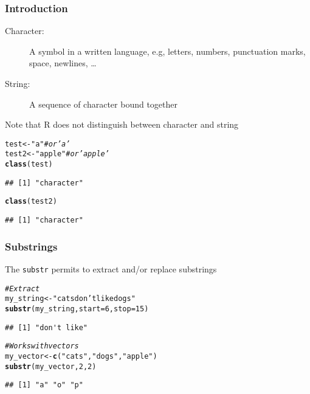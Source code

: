 \documentclass[paper=screen,mathserif]{beamer}\usepackage[]{graphicx}\usepackage[]{color}
\makeatletter
\newcommand{\hlnum}[1]{\textcolor[rgb]{0.686,0.059,0.569}{#1}}%
\newcommand{\hlstr}[1]{\textcolor[rgb]{0.192,0.494,0.8}{#1}}%
\newcommand{\hlcom}[1]{\textcolor[rgb]{0.678,0.584,0.686}{\textit{#1}}}%
\newcommand{\hlstd}[1]{\textcolor[rgb]{0.345,0.345,0.345}{#1}}%
\newcommand{\hlkwb}[1]{\textcolor[rgb]{0.69,0.353,0.396}{#1}}%
\newcommand{\hlkwc}[1]{\textcolor[rgb]{0.333,0.667,0.333}{#1}}%
\newcommand{\hlkwd}[1]{\textcolor[rgb]{0.737,0.353,0.396}{\textbf{#1}}}%
\newenvironment{kframe}{%
 \def\at@end@of@kframe{}%
 \ifinner\ifhmode%
  \def\at@end@of@kframe{\end{minipage}}%
  \begin{minipage}{\columnwidth}%
 \fi\fi%
 \def\FrameCommand##1{\hskip\@totalleftmargin \hskip-\fboxsep
 \colorbox{shadecolor}{##1}\hskip-\fboxsep
     \hskip-\linewidth \hskip-\@totalleftmargin \hskip\columnwidth}%
 \MakeFramed {\advance\hsize-\width
   \@totalleftmargin\z@ \linewidth\hsize
   \@setminipage}}%
 {\par\unskip\endMakeFramed%
 \at@end@of@kframe}
\newenvironment{knitrout}{}{} %
\newcommand{\ft}[1]{\frametitle{#1}}
\newenvironment{xframe}[1][]
{\begin{frame}[fragile,environment=xframe]
    \frametitle{#1}}
  {\end{frame}}
\makeatother
\begin{document}
\begin{xframe}
  \ft{Introduction}
  
  \begin{description}
  \item[Character:] A symbol in a written language, e.g, letters,
    numbers, punctuation marks, space, newlines, \dots
  \item[String:] A sequence of character bound together
  \end{description}
  Note that R does not distinguish between character and string
\begin{knitrout}\scriptsize
{}\color{fgcolor}\begin{kframe}
\begin{alltt}
\hlstd{test} \hlkwb{<-} \hlstr{"a"} \hlcom{# or 'a'}
\hlstd{test2} \hlkwb{<-} \hlstr{"apple"} \hlcom{# or 'apple'}
\hlkwd{class}\hlstd{(test)}
\end{alltt}
\begin{verbatim}
## [1] "character"
\end{verbatim}
\begin{alltt}
\hlkwd{class}\hlstd{(test2)}
\end{alltt}
\begin{verbatim}
## [1] "character"
\end{verbatim}
\end{kframe}
\end{knitrout}

\end{xframe}


\begin{xframe}
  \ft{Substrings}
  
  The {\tt substr} permits to extract and/or replace substrings
\begin{knitrout}\scriptsize
{}\color{fgcolor}\begin{kframe}
\begin{alltt}
\hlcom{# Extract}
\hlstd{my_string} \hlkwb{<-} \hlstr{"cats don't like dogs"}
\hlkwd{substr}\hlstd{(my_string,} \hlkwc{start} \hlstd{=} \hlnum{6}\hlstd{,} \hlkwc{stop} \hlstd{=} \hlnum{15}\hlstd{)}
\end{alltt}
\begin{verbatim}
## [1] "don't like"
\end{verbatim}
\end{kframe}
\end{knitrout}
\begin{knitrout}\scriptsize
{}\color{fgcolor}\begin{kframe}
\begin{alltt}
\hlcom{# Works with vectors}
\hlstd{my_vector} \hlkwb{<-} \hlkwd{c}\hlstd{(}\hlstr{"cats"}\hlstd{,} \hlstr{"dogs"}\hlstd{,} \hlstr{"apple"}\hlstd{)}
\hlkwd{substr}\hlstd{(my_vector,} \hlnum{2}\hlstd{,} \hlnum{2}\hlstd{)}
\end{alltt}
\begin{verbatim}
## [1] "a" "o" "p"
\end{verbatim}
\end{kframe}
\end{knitrout}
\end{xframe}
\end{document}

